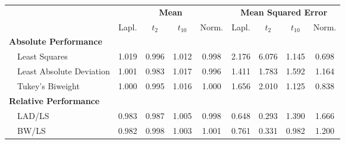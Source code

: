 %
\begin{center}
\begin{tabular}{|l||c|c|c|c||c|c|c|c|} \hline
\multicolumn{1}{|l||}{\bf }&\multicolumn{4}{c||}{\bf Mean}&\multicolumn{4}{c|}{\bf Mean Squared Error}\\ \cline{2-9}
\multicolumn{1}{|l||}{}&\multicolumn{1}{c|}{Lapl.}&\multicolumn{1}{c|}{$t_2$}&\multicolumn{1}{c|}{$t_{10}$}&\multicolumn{1}{c||}{Norm.}&\multicolumn{1}{c|}{Lapl.}&\multicolumn{1}{c|}{$t_2$}&\multicolumn{1}{c|}{$t_{10}$}&\multicolumn{1}{c|}{Norm.}\\ \hline
{\bf Absolute Performance}&&&&&&&&\\
~~Least Squares&1.019&0.996&1.012&0.998&2.176&6.076&1.145&0.698\\ 
~~Least Absolute Deviation&1.001&0.983&1.017&0.996&1.411&1.783&1.592&1.164\\ 
~~Tukey's Biweight&1.000&0.995&1.016&1.000&1.656&2.010&1.125&0.838\\ \hline
{\bf Relative Performance}&&&&&&&&\\
~~LAD/LS&0.983&0.987&1.005&0.998&0.648&0.293&1.390&1.666\\ 
~~BW/LS&0.982&0.998&1.003&1.001&0.761&0.331&0.982&1.200\\ 
\hline
\end{tabular}
\end{center}
